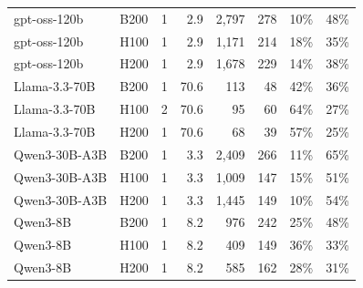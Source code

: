 \begin{table}[t]
\begin{tabular}{llrrrrrr}
gpt-oss-120b & B200 & 1 & 2.9 & 2,797 & 278 & 10\% & 48\% \\
gpt-oss-120b & H100 & 1 & 2.9 & 1,171 & 214 & 18\% & 35\% \\
gpt-oss-120b & H200 & 1 & 2.9 & 1,678 & 229 & 14\% & 38\% \\
Llama-3.3-70B & B200 & 1 & 70.6 & 113 & 48 & 42\% & 36\% \\
Llama-3.3-70B & H100 & 2 & 70.6 & 95 & 60 & 64\% & 27\% \\
Llama-3.3-70B & H200 & 1 & 70.6 & 68 & 39 & 57\% & 25\% \\
Qwen3-30B-A3B & B200 & 1 & 3.3 & 2,409 & 266 & 11\% & 65\% \\
Qwen3-30B-A3B & H100 & 1 & 3.3 & 1,009 & 147 & 15\% & 51\% \\
Qwen3-30B-A3B & H200 & 1 & 3.3 & 1,445 & 149 & 10\% & 54\% \\
Qwen3-8B & B200 & 1 & 8.2 & 976 & 242 & 25\% & 48\% \\
Qwen3-8B & H100 & 1 & 8.2 & 409 & 149 & 36\% & 33\% \\
Qwen3-8B & H200 & 1 & 8.2 & 585 & 162 & 28\% & 31\% \\
\bottomrule
\end{tabular}
\end{table}
